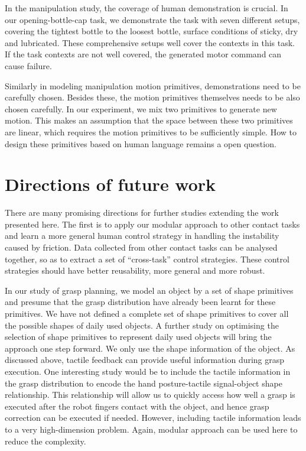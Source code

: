 In the manipulation study, the coverage of human demonstration is crucial. In our opening-bottle-cap task, we demonstrate the task with seven different setups, covering the tightest bottle to the loosest bottle, surface conditions of sticky, dry and lubricated. These comprehensive setups well cover the contexts in this task. If the task contexts are not well covered, the generated motor command can cause failure.


Similarly in modeling manipulation motion primitives, demonstrations need to be carefully chosen. Besides these, the motion primitives themselves needs to be also chosen carefully.
In our experiment, we mix two primitives to generate new motion. This makes an assumption that the space between these two primitives are linear, which requires the motion primitives to be sufficiently simple. How to design these primitives based on human language remains a open question.







\section{Directions of future work}
\label{cha6:future}

There are many promising directions for further studies extending the
work presented here. The first is to apply our modular approach to other
contact tasks and learn a more general human control strategy in
handling the instability caused by friction. Data collected from other contact tasks can be analysed together, so as to extract a set of ``cross-task'' control strategies. These control strategies should have better reusability, more general and more robust.

In our study of grasp planning, we model an object by a set of shape primitives and presume that the grasp distribution have already been learnt for these primitives. We have not defined a complete set of shape primitives to cover all the possible shapes of daily used objects. A further study on optimising the selection of shape primitives to represent daily used objects will bring the approach one step forward.
We only use the shape information of the object. As discussed above, tactile feedback can provide useful information during grasp execution. One interesting study would be to include the tactile information in the grasp distribution to encode the hand posture-tactile signal-object shape relationship. This relationship will allow us to quickly access how well a grasp is executed after the robot fingers contact with the object, and hence grasp correction can be executed if needed. However, including tactile information leads to a very high-dimension problem. Again, modular approach can be used here to reduce the complexity.

